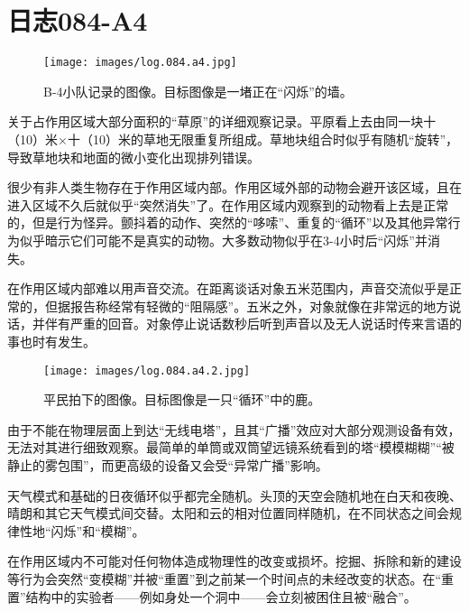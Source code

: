 \section{日志084-A4}

\label{sec:DOC-log-084-a4}


\begin{figure}[H]
    \centering
    \texttt{[image: images/log.084.a4.jpg]}
    \caption*{B-4小队记录的图像。目标图像是一堵正在“闪烁”的墙。}
\end{figure}

\hr

关于占作用区域大部分面积的“草原”的详细观察记录。平原看上去由同一块十（10）米×十（10）米的草地无限重复所组成。草地块组合时似乎有随机“旋转”，导致草地块和地面的微小变化出现排列错误。

\hr

很少有非人类生物存在于作用区域内部。作用区域外部的动物会避开该区域，且在进入区域不久后就似乎“突然消失”了。在作用区域内观察到的动物看上去是正常的，但是行为怪异。颤抖着的动作、突然的“哆嗦”、重复的“循环”以及其他异常行为似乎暗示它们可能不是真实的动物。大多数动物似乎在3-4小时后“闪烁”并消失。

\hr

在作用区域内部难以用声音交流。在距离谈话对象五米范围内，声音交流似乎是正常的，但据报告称经常有轻微的“阻隔感”。五米之外，对象就像在非常远的地方说话，并伴有严重的回音。对象停止说话数秒后听到声音以及无人说话时传来言语的事也时有发生。

\begin{figure}[H]
    \centering
    \texttt{[image: images/log.084.a4.2.jpg]}
    \caption*{平民拍下的图像。目标图像是一只“循环”中的鹿。}
\end{figure}

\hr

由于不能在物理层面上到达“无线电塔”，且其“广播”效应对大部分观测设备有效，无法对其进行细致观察。最简单的单筒或双筒望远镜系统看到的塔“模模糊糊”“被静止的雾包围”，而更高级的设备又会受“异常广播”影响。

\hr

天气模式和基础的日夜循环似乎都完全随机。头顶的天空会随机地在白天和夜晚、晴朗和其它天气模式间交替。太阳和云的相对位置同样随机，在不同状态之间会规律性地“闪烁”和“模糊”。

\hr

在作用区域内不可能对任何物体造成物理性的改变或损坏。挖掘、拆除和新的建设等行为会突然“变模糊”并被“重置”到之前某一个时间点的未经改变的状态。在“重置”结构中的实验者——例如身处一个洞中——会立刻被困住且被“融合”。

